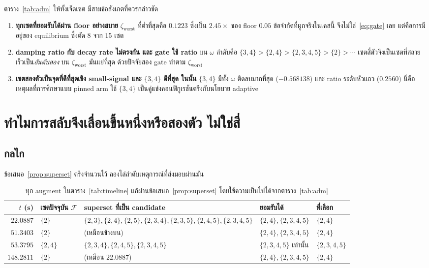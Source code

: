 \documentclass[12pt,a4paper]{article}
\theoremstyle{remark}
\newcommand{\zworst}{\zeta_{\mathrm{worst}}}
\begin{document}
ตาราง~\ref{tab:adm} ให้ทั้งเจ็ดเซต มีสามข้อสังเกตที่ควรกล่าวชัด

\begin{enumerate}[leftmargin=1.9em]
\item \textbf{ทุกเซตที่ยอมรับได้ผ่าน floor อย่างสบาย} $\zworst$ ที่ต่ำที่สุดคือ
      $0.1223$ ซึ่งเป็น $2.45\times$ ของ floor $0.05$ ข้อจำกัดที่ผูกจริงในเคสนี้
      จึงไม่ใช่~\eqref{eq:gate} เลย แต่คือการมีอยู่ของ equilibrium ซึ่งตัด
      $8$ จาก $15$ เซต
\item \textbf{damping ratio กับ decay rate ไม่ตรงกัน และ gate ใช้ ratio}
      บน $\omega$ ลำดับคือ $\{3,4\} > \{2,4\} > \{2,3,4,5\} > \{2\} > \cdots$
      เซตสี่ตัวจึงเป็นเซตที่สลายเร็วเป็น\emph{อันดับสอง} บน $\zworst$ มันแย่ที่สุด
      ด้วยปัจจัยสอง gate ทำตาม $\zworst$
\item \textbf{เซตสองตัวเป็นจุดที่ดีที่สุดเชิง small-signal และ $\{3,4\}$ ดีที่สุด
      ในนั้น} $\{3,4\}$ มีทั้ง $\omega$ ติดลบมากที่สุด ($-0.568138$) และ ratio
      ระดับหัวแถว ($0.2560$) นี่คือเหตุผลที่การศึกษาแบบ pinned arm ใช้ $\{3,4\}$
      เป็นคู่แข่งคอนฟิกูเรชันตรึงกับนโยบาย adaptive
\end{enumerate}

\section{ทำไมการสลับจึงเลื่อนขึ้นหนึ่งหรือสองตัว ไม่ใช่สี่}\label{sec:count}

\subsection{กลไก}

ข้อเสนอ~\ref{prop:superset} ตรึงจำนวนไว้ ลองไล่ลำดับเหตุการณ์ที่ส่งมอบผ่านมัน

\begin{table}[H]
\centering
\small
\begin{tabular}{@{}rllll@{}}
\toprule
$t$ (s) & \textbf{เซตปัจจุบัน $\mathcal{F}$} & \textbf{superset ที่เป็น candidate} & \textbf{ยอมรับได้} & \textbf{ที่เลือก}\\
\midrule
$22.0887$ & $\{2\}$ & $\{2,3\},\{2,4\},\{2,5\},\{2,3,4\},\{2,3,5\},\{2,4,5\},\{2,3,4,5\}$
          & $\{2,4\},\{2,3,4,5\}$ & $\{2,4\}$\\
$51.3403$ & $\{2\}$ & (เหมือนข้างบน) & $\{2,4\},\{2,3,4,5\}$ & $\{2,4\}$\\
$53.3795$ & $\{2,4\}$ & $\{2,3,4\},\{2,4,5\},\{2,3,4,5\}$ & $\{2,3,4,5\}$ เท่านั้น & $\{2,3,4,5\}$\\
$148.2811$& $\{2\}$ & (เหมือน $22.0887$) & $\{2,4\},\{2,3,4,5\}$ & $\{2,4\}$\\
\bottomrule
\end{tabular}
\caption{ทุก augment ในตาราง~\ref{tab:timeline} แก้ผ่านข้อเสนอ~\ref{prop:superset}
โดยใช้ความเป็นไปได้จากตาราง~\ref{tab:adm}}
\label{tab:resolution}
\end{table}
\end{document}
